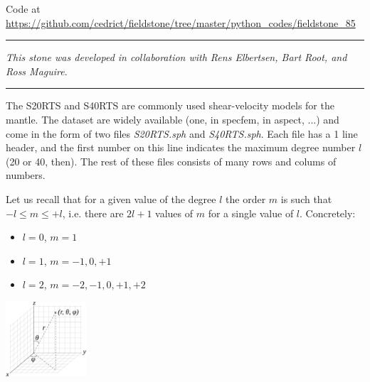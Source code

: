 
\begin{center}
Code at \url{https://github.com/cedrict/fieldstone/tree/master/python_codes/fieldstone_85}
\end{center}

\par\noindent\rule{\textwidth}{0.4pt}

{\sl This stone was developed in collaboration with Rens Elbertsen, Bart Root, and Ross Maguire}. 

\par\noindent\rule{\textwidth}{0.4pt}

\vspace{1cm}



The S20RTS \cite{rivw99} and S40RTS \cite{ridv11} are commonly used shear-velocity models for the mantle.
The dataset are widely available (one, in specfem, in aspect, ...) and come in the form of two 
files {\sl S20RTS.sph} and {\sl S40RTS.sph}. 
Each file has a 1 line header, and the first number on this line indicates the maximum degree number $l$ 
(20 or 40, then). The rest of these files consists of many rows and colums of numbers.

Let us recall that for a given value of the degree $l$ the order $m$ is such that $-l \le m \le +l$, i.e. 
there are $2l+1$ values of $m$ for a single value of $l$. Concretely:
\begin{itemize}
\item $l=0$, $m=1$ 
\item $l=1$, $m=-1,0,+1$ 
\item $l=2$, $m=-2,-1,0,+1,+2$ 
\end{itemize}

\begin{center}
\includegraphics[width=3cm]{images/sphcoord}
\end{center}

